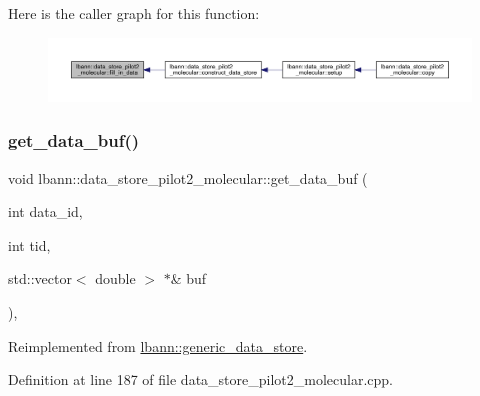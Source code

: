 Here is the caller graph for this function\+:\nopagebreak
\begin{figure}[H]
\begin{center}
\leavevmode
\includegraphics[width=350pt]{classlbann_1_1data__store__pilot2__molecular_a0157fe4d04961c03c0d983cb43aa1cec_icgraph}
\end{center}
\end{figure}
\mbox{\label{classlbann_1_1data__store__pilot2__molecular_ab0f82fb7fdec7779bbb693e06a206127}} 
\subsubsection{\texorpdfstring{get\+\_\+data\+\_\+buf()}{get\_data\_buf()}}
{\footnotesize\ttfamily void lbann\+::data\+\_\+store\+\_\+pilot2\+\_\+molecular\+::get\+\_\+data\+\_\+buf (\begin{DoxyParamCaption}\item[{int}]{data\+\_\+id,  }\item[{int}]{tid,  }\item[{std\+::vector$<$ double $>$ $\ast$\&}]{buf }\end{DoxyParamCaption})\hspace{0.3cm}{\ttfamily [override]}, {\ttfamily [virtual]}}



Reimplemented from \hyperlink{classlbann_1_1generic__data__store_abc3fecd958650a74e76070ea4f394bea}{lbann\+::generic\+\_\+data\+\_\+store}.



Definition at line 187 of file data\+\_\+store\+\_\+pilot2\+\_\+molecular.\+cpp.


